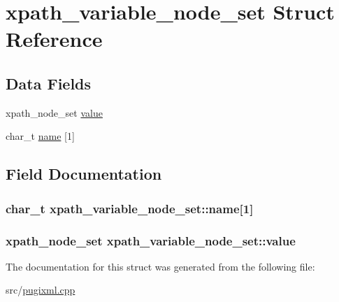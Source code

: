 \hypertarget{structxpath__variable__node__set}{
\section{xpath\_\-variable\_\-node\_\-set Struct Reference}
\label{structxpath__variable__node__set}
}
\subsection*{Data Fields}
\begin{DoxyCompactItemize}
\item 
xpath\_\-node\_\-set \hyperlink{structxpath__variable__node__set_a830ac0dbcaf5f8ff3373d10273e72bf4}{value}
\item 
char\_\-t \hyperlink{structxpath__variable__node__set_a9a6a40cea40764364adb3ddba2e7a2ff}{name} \mbox{[}1\mbox{]}
\end{DoxyCompactItemize}


\subsection{Field Documentation}
\hypertarget{structxpath__variable__node__set_a9a6a40cea40764364adb3ddba2e7a2ff}{
\subsubsection[{name}]{\setlength{\rightskip}{0pt plus 5cm}char\_\-t {\bf xpath\_\-variable\_\-node\_\-set::name}\mbox{[}1\mbox{]}}}
\label{structxpath__variable__node__set_a9a6a40cea40764364adb3ddba2e7a2ff}
\hypertarget{structxpath__variable__node__set_a830ac0dbcaf5f8ff3373d10273e72bf4}{
\subsubsection[{value}]{\setlength{\rightskip}{0pt plus 5cm}xpath\_\-node\_\-set {\bf xpath\_\-variable\_\-node\_\-set::value}}}
\label{structxpath__variable__node__set_a830ac0dbcaf5f8ff3373d10273e72bf4}


The documentation for this struct was generated from the following file:\begin{DoxyCompactItemize}
\item 
src/\hyperlink{pugixml_8cpp}{pugixml.cpp}\end{DoxyCompactItemize}
